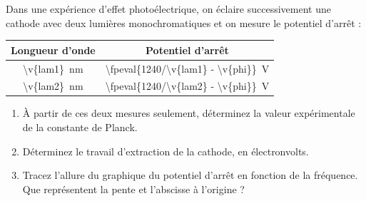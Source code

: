 Dans une expérience d'effet photoélectrique, on éclaire successivement une cathode avec deux lumières monochromatiques et on mesure le potentiel d'arrêt :
\begin{center}
\begin{tabular}{cc}
Longueur d'onde & Potentiel d'arrêt \\ \hline
\qty{\v{lam1}}{nm} & \qty[round-mode=places,round-precision=3]{\fpeval{1240/\v{lam1} - \v{phi}}}{V} \\
\qty{\v{lam2}}{nm} & \qty[round-mode=places,round-precision=3]{\fpeval{1240/\v{lam2} - \v{phi}}}{V}
\end{tabular}
\end{center}

\begin{enumerate}[label=\alph*)]
    \item À partir de ces deux mesures seulement, déterminez la valeur expérimentale de la constante de Planck.
    \item Déterminez le travail d'extraction de la cathode, en électronvolts.
    \item Tracez l'allure du graphique du potentiel d'arrêt en fonction de la fréquence. Que représentent la pente et l'abscisse à l'origine ?
\end{enumerate}
